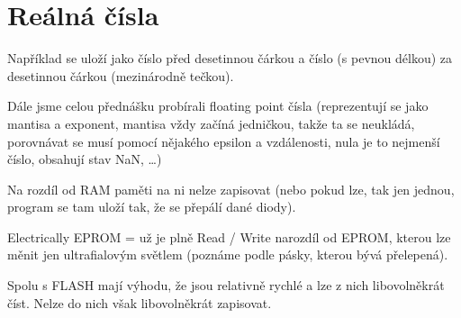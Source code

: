 \documentclass[12pt]{article}					%
\begin{document}
\section{Reálná čísla}
    \begin{definice}[Ukládání]
        Například se uloží jako číslo před desetinnou čárkou a číslo (s pevnou délkou) za desetinnou čárkou (mezinárodně tečkou).
    \end{definice}


    \begin{poznamka}
        Dále jsme celou přednášku probírali floating point čísla (reprezentují se jako mantisa a exponent, mantisa vždy začíná jedničkou, takže ta se neukládá, porovnávat se musí pomocí nějakého epsilon a vzdálenosti, nula je to nejmenší číslo, obsahují stav NaN, …)
    \end{poznamka}

    \begin{definice}
        Na rozdíl od RAM paměti na ni nelze zapisovat (nebo pokud lze, tak jen jednou, program se tam uloží tak, že se přepálí dané diody).
    \end{definice}


    \begin{definice}[EEPROM]
        Electrically EPROM = už je plně Read / Write narozdíl od EPROM, kterou lze měnit jen ultrafialovým světlem (poznáme podle pásky, kterou bývá přelepená).

        Spolu s FLASH mají výhodu, že jsou relativně rychlé a lze z nich libovolněkrát číst. Nelze do nich však libovolněkrát zapisovat.
    \end{definice}
\end{document}
